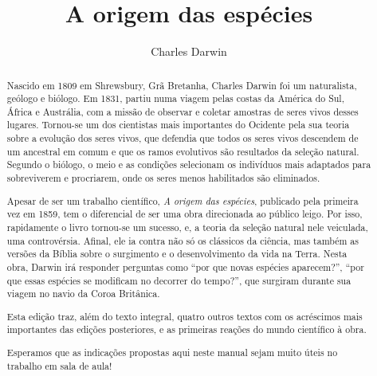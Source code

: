 \documentclass[11pt]{extarticle}
\begin{document}
\newcommand{\AutorLivro}{Charles Darwin}
\newcommand{\TituloLivro}{A origem das espécies}
\newcommand{\Tema}{História da ciência}
\newcommand{\Genero}{Tratado científico}
\newcommand{\imagemCapa}{./images/PNLD0060-01.png}
\newcommand{\issnppub}{---}
\newcommand{\issnepub}{---}
\newcommand{\colaborador}{{Vicente Castro e Bruno Gradella}} 


\title{\TituloLivro}
\author{\AutorLivro}
\def\authornotes{\colaborador}

\date{}
\maketitle






\begin{abstract} 

Nascido em 1809 em Shrewsbury, Grã Bretanha, Charles Darwin foi um naturalista,
geólogo e biólogo. Em 1831, partiu numa viagem pelas costas da América do Sul,
África e Austrália, com a missão de observar e coletar amostras de seres vivos
desses lugares. Tornou-se um dos cientistas mais importantes do Ocidente pela
sua teoria sobre a evolução dos seres vivos, que defendia que todos os seres
vivos descendem de um ancestral em comum e que os ramos evolutivos são
resultados da seleção natural. Segundo o biólogo, o meio e as condições
selecionam os indivíduos mais adaptados para sobreviverem e procriarem, onde os
seres menos habilitados são eliminados.

Apesar de ser um trabalho científico, \emph{A origem das espécies}, publicado
pela primeira vez em 1859, tem o diferencial de ser uma obra direcionada ao
público leigo.  Por isso, rapidamente o livro tornou-se um sucesso, e, a teoria
da seleção natural nele veiculada, uma controvérsia. Afinal, ele ia contra não
só os clássicos da ciência, mas também as versões da Bíblia sobre o surgimento
e o desenvolvimento da vida na Terra.  Nesta obra, Darwin irá responder
perguntas como ``por que novas espécies aparecem?'', ``por que essas espécies se
modificam no decorrer do tempo?'', que surgiram durante sua viagem no navio da
Coroa Britânica. 

Esta edição traz, além do texto integral, quatro outros textos com os
acréscimos mais importantes das edições posteriores, e as primeiras reações do
mundo científico à obra. 

Esperamos que as indicações propostas aqui neste manual sejam muito úteis no
trabalho em sala de aula!

\end{abstract}
\end{document}
